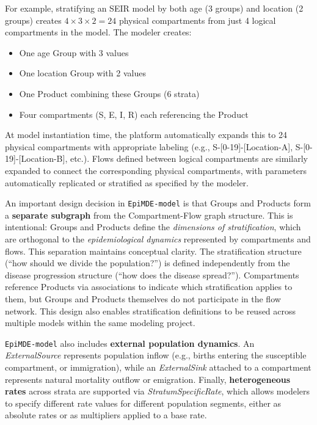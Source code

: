 For example, stratifying an SEIR model by both age (3 groups) and location (2 groups) creates $4 \times 3 \times 2 = 24$ physical compartments from just 4 logical compartments in the model. The modeler creates:
\begin{itemize}
    \item One age Group with 3 values
    \item One location Group with 2 values
    \item One Product combining these Groups (6 strata)
    \item Four compartments (S, E, I, R) each referencing the Product
\end{itemize}
At model instantiation time, the platform automatically expands this to 24 physical compartments with appropriate labeling (e.g., S-[0-19]-[Location-A], S-[0-19]-[Location-B], etc.). Flows defined between logical compartments are similarly expanded to connect the corresponding physical compartments, with parameters automatically replicated or stratified as specified by the modeler.

An important design decision in \texttt{EpiMDE-model} is that Groups and Products form a \textbf{separate subgraph} from the Compartment-Flow graph structure. This is intentional: Groups and Products define the \emph{dimensions of stratification}, which are orthogonal to the \emph{epidemiological dynamics} represented by compartments and flows. This separation maintains conceptual clarity. The stratification structure (``how should we divide the population?'') is defined independently from the disease progression structure (``how does the disease spread?''). Compartments reference Products via associations to indicate which stratification applies to them, but Groups and Products themselves do not participate in the flow network. This design also enables stratification definitions to be reused across multiple models within the same modeling project.

\texttt{EpiMDE-model} also includes \textbf{external population dynamics}. An \textit{ExternalSource} represents population inflow (e.g., births entering the susceptible compartment, or immigration), while an \textit{ExternalSink} attached to a compartment represents natural mortality outflow or emigration. Finally, \textbf{heterogeneous rates} across strata are supported via \textit{StratumSpecificRate}, which allows modelers to specify different rate values for different population segments, either as absolute rates or as multipliers applied to a base rate.

